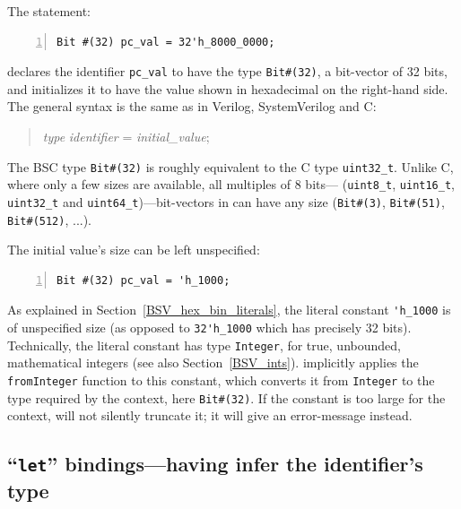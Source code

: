The {\BSV} statement:

{\footnotesize
\begin{Verbatim}[frame=single, numbers=left]
   Bit #(32) pc_val = 32'h_8000_0000;
\end{Verbatim}
}

declares the identifier \verb|pc_val| to have the type
\verb|Bit#(32)|, {\ie} a bit-vector of 32 bits, and initializes it to
have the value shown in hexadecimal on the right-hand side.
The general syntax is the same as in Verilog, SystemVerilog and C:
\begin{quote}
\emph{type} \emph{identifier} = \emph{initial\_value};
\end{quote}

The BSC type \verb|Bit#(32)| is roughly equivalent to the C type
\verb|uint32_t|.  Unlike C, where only a few sizes are available, all
multiples of 8 bits--- (\verb|uint8_t|, \verb|uint16_t|,
\verb|uint32_t| and \verb|uint64_t|)---bit-vectors in {\BSV} can have any
size (\verb|Bit#(3)|, \verb|Bit#(51)|, \verb|Bit#(512)|, ...).

The initial value's size can be left unspecified:

{\footnotesize
\begin{Verbatim}[frame=single, numbers=left]
   Bit #(32) pc_val = 'h_1000;
\end{Verbatim}
}

As explained in Section~\ref{BSV_hex_bin_literals}, the literal
constant \verb|'h_1000| is of unspecified size (as opposed to
\verb|32'h_1000| which has precisely 32 bits).  Technically, the
literal constant has {\BSV} type {\tt Integer}, for true, unbounded,
mathematical integers (see also Section~\ref{BSV_ints}).  {\bsc}
implicitly applies the {\tt fromInteger} function to this constant,
which converts it from {\tt Integer} to the type required by the
context, here \verb|Bit#(32)|.  If the constant is too large for the
context, {\bsc} will not silently truncate it; it will give an
error-message instead.



\subsection{``{\tt let}'' bindings---having {\bsc} infer the identifier's type}

\label{Sec_let_binding}


